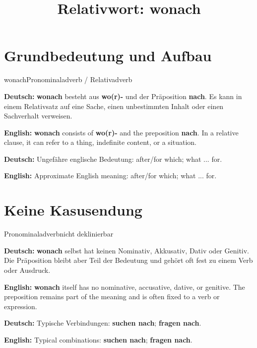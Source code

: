 \documentclass[a4paper,11pt]{article}
\title{Relativwort: \glqq wonach\grqq{}}
\date{}
\newcommand{\GermanText}[1]{\textbf{Deutsch: }#1\par}
\newcommand{\EnglishText}[1]{{\small\color{SoftGray}\textbf{English: }#1\par}}
\begin{document}
\maketitle

\tableofcontents

\newpage

\section{Grundbedeutung und Aufbau}

\begin{grammarentry}{wonach}{Pronominaladverb / Relativadverb}

\GermanText{\textbf{wonach} besteht aus \textbf{wo(r)-} und der Präposition \textbf{nach}. Es kann in einem Relativsatz auf eine Sache, einen unbestimmten Inhalt oder einen Sachverhalt verweisen.}

\EnglishText{\textbf{wonach} consists of \textbf{wo(r)-} and the preposition \textbf{nach}. In a relative clause, it can refer to a thing, indefinite content, or a situation.}

\GermanText{Ungefähre englische Bedeutung: \glqq after/for which; what ... for\grqq{}.}

\EnglishText{Approximate English meaning: \glqq after/for which; what ... for\grqq{}.}

\end{grammarentry}

\section{Keine Kasusendung}

\begin{grammarentry}{Pronominaladverb}{nicht deklinierbar}

\GermanText{\textbf{wonach} selbst hat keinen Nominativ, Akkusativ, Dativ oder Genitiv. Die Präposition bleibt aber Teil der Bedeutung und gehört oft fest zu einem Verb oder Ausdruck.}

\EnglishText{\textbf{wonach} itself has no nominative, accusative, dative, or genitive. The preposition remains part of the meaning and is often fixed to a verb or expression.}

\GermanText{Typische Verbindungen: \textbf{suchen nach}; \textbf{fragen nach}.}

\EnglishText{Typical combinations: \textbf{suchen nach}; \textbf{fragen nach}.}

\end{grammarentry}
\end{document}
